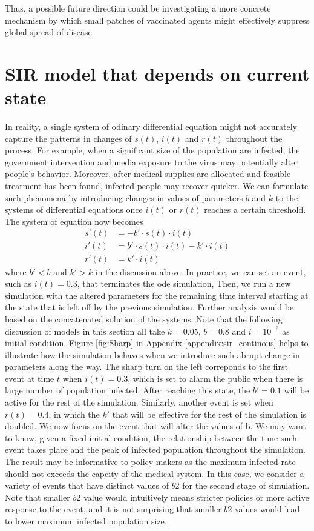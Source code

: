 \documentclass[12pt, reqno]{amsart}
\begin{document}
    Thus, a possible future direction could be investigating a more concrete mechanism by which small patches of vaccinated agents might effectively suppress global spread of disease.

    \section{SIR model that depends on current state}\label{section:current_state}
    In reality, a single system of odinary differential equation might not accurately capture the patterns in changes of \(s(t)\), \(i(t)\) and \(r(t)\) throughout the process. For example, when a significant size of the population are infected, the government intervention and media exposure to the virus may potentially alter people's behavior. Moreover, after medical supplies are allocated and feasible treatment has been found, infected people may recover quicker. We can formulate such phenomena by introducing changes in values of parameters \(b\) and \(k\) to the systems of differential equations once \(i(t)\) or \(r(t)\) reaches a certain threshold. The system of equation now becomes
    \begin{align*}
        s'(t) &= -b'\cdot s(t) \cdot i(t) \\
        i'(t) &= b'\cdot s(t) \cdot i(t) - k'\cdot i(t) \\
        r'(t) &= k'\cdot i(t)
    \end{align*}
where $b' < b$ and $k' > k$ in the discussion above. In practice, we can set an event, such as  \(i(t) = 0.3\), that terminates the ode simulation, Then, we run a new simulation with the altered parameters for the remaining time interval starting at the state that is left off by the previous simulation. Further analysis would be based on the concatenated solution of the systems. Note that the following discussion of models in this section all take $k = 0.05$, $b = 0.8$ and $i=10^{-6}$ as initial condition. Figure \ref{fig:Sharp} in Appendix \ref{appendix:sir_continous} helps to illustrate how the simulation behaves when we introduce such abrupt change in parameters along the way. The sharp turn on the left correponds to the first event at time $t$ when \(i(t) = 0.3\), which is set to alarm the public when there is large number of population infected. After reaching this state, the $b'=0.1$ will be active for the rest of the simulation. Similarly, another event is set when \(r(t) = 0.4\), in which the $k'$ that will be effective for the rest of the simulation is doubled. We now focus on the event that will alter the values of b. We may want to know, given a fixed initial condition, the relationship between the time such event takes place and the peak of infected population throughout the simulation. The result may be informative to policy makers as the maximum infected rate should not exceeds the capcity of the medical system. In this case, we consider a variety of events that have distinct values of $b2$ for the second stage of simulation. Note that smaller $b2$ value would intuitively means stricter policies or more active response to the event, and it is not surprising that smaller $b2$ values would lead to lower maximum infected population size. 
\end{document}
